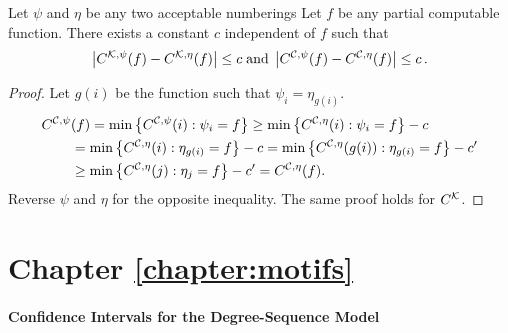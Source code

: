 \begin{lemma}
Let $\psi$ and $\eta$ be any two acceptable numberings Let $f$ be any partial computable function. There exists a constant $c$ independent of $f$ such that \belowdisplayskip=-12pt
\[
\left| C^{{\cal K},\psi}(f) - C^{{\cal K}, \eta}(f)\right | \leq c \;\text{and}\; \left| C^{{\cal C},\psi}(f) - C^{{\cal C}, \eta}(f)\right | \leq c \,\text{.}
\] \label{lemma:invariance}
\end{lemma}
\begin{proof}
Let $g(i)$ be the function such that $\psi_i=\eta_{g(i)}$.
\begin{align*}
C^{{\cal C},\psi}&(f) = \min\left\{ C^{{\cal C},\psi}(i) : \psi_i= f\right\} 
\geq \min\left\{ C^{{\cal C}, \eta}(i) : \psi_i= f\right\} - c\\
&= \min\left\{ C^{{\cal C}, \eta}(i) : \eta_{g(i)}= f\right\} - c
= \min\left\{ C^{{\cal C}, \eta}(g(i)) : \eta_{g(i)}= f\right\} - c'\\
&\geq \min\left\{ C^{{\cal C}, \eta}(j) : \eta_j= f\right\} - c' 
= C^{{\cal C}, \eta}(f).
\end{align*}
Reverse $\psi$ and $\eta$ for the opposite inequality. The same proof holds for $C^{\cal K}$.
\end{proof}

\section{Chapter \ref{chapter:motifs}}

\paragraph{Confidence Intervals for the Degree-Sequence Model}
\label{section:confidence-intervals}

